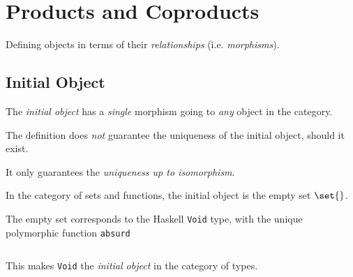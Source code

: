 \section{Products and Coproducts}

\begin{definition}
    Defining objects in terms of their \textit{relationships} (i.e. \textit{morphisms}).
\end{definition}

\subsection{Initial Object}

\begin{definition}
    The \textit{initial object} has a \textit{single} morphism going to \textit{any} object in the category.
\end{definition}

\begin{remark}
    The definition does \textit{not} guarantee the uniqueness of the initial object, should it exist.
    
    It only guarantees the \textit{uniqueness up to isomorphism}.
\end{remark}

\begin{example}
    In the category of sets and functions, the initial object is the empty set $\set{}$.
    
    The empty set corresponds to the Haskell \texttt{Void} type, with the unique polymorphic function \texttt{absurd}
    \inputminted{hs}{content/code-listings/absurd.hs}
    
    This makes \texttt{Void} the \textit{initial object} in the category of types.
\end{example}


